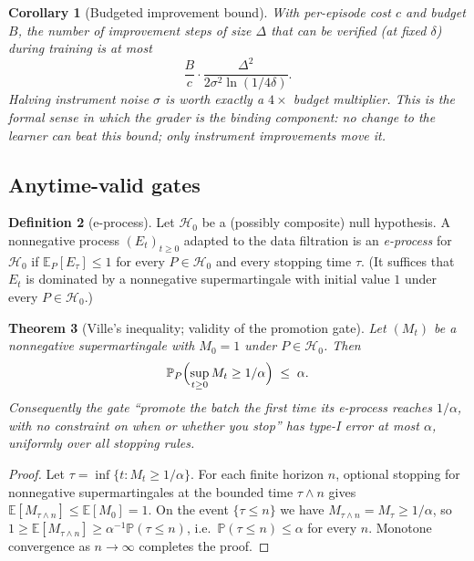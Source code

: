 \documentclass[11pt]{article}
\theoremstyle{plain}
\newtheorem{theorem}{Theorem}[section]
\newtheorem{corollary}[theorem]{Corollary}
\theoremstyle{definition}
\newtheorem{definition}[theorem]{Definition}
\theoremstyle{remark}
\newcommand{\E}{\mathbb{E}}
\newcommand{\Prob}{\mathbb{P}}
\newcommand{\cH}{\mathcal{H}}
\begin{document}
\begin{corollary}[Budgeted improvement bound]\label{cor:budget}
With per-episode cost $c$ and budget $B$, the number of improvement steps of
size $\Delta$ that can be \emph{verified} (at fixed $\delta$) during training
is at most
\[
  \frac{B}{c} \cdot \frac{\Delta^2}{2\sigma^2 \ln(1/4\delta)} .
\]
Halving instrument noise $\sigma$ is worth exactly a $4\times$ budget
multiplier. This is the formal sense in which the grader is the binding
component: \emph{no} change to the learner can beat this bound; only
instrument improvements move it.
\end{corollary}

\subsection{Anytime-valid gates}

\begin{definition}[e-process]\label{def:eprocess}
Let $\cH_0$ be a (possibly composite) null hypothesis. A nonnegative process
$(E_t)_{t \ge 0}$ adapted to the data filtration is an \emph{e-process} for
$\cH_0$ if $\E_P[E_\tau] \le 1$ for every $P \in \cH_0$ and every stopping
time $\tau$. (It suffices that $E_t$ is dominated by a nonnegative
supermartingale with initial value $1$ under every $P \in \cH_0$.)
\end{definition}

\begin{theorem}[Ville's inequality; validity of the promotion gate]
\label{thm:ville}
Let $(M_t)$ be a nonnegative supermartingale with $M_0 = 1$ under
$P \in \cH_0$. Then
\[
  \Prob_P\Bigl( \sup_{t \ge 0} M_t \ge 1/\alpha \Bigr) \;\le\; \alpha .
\]
Consequently the gate ``promote the batch the first time its e-process
reaches $1/\alpha$, with no constraint on when or whether you stop'' has
type-I error at most $\alpha$, \emph{uniformly over all stopping rules}.
\end{theorem}

\begin{proof}
Let $\tau = \inf\{t : M_t \ge 1/\alpha\}$. For each finite horizon $n$,
optional stopping for nonnegative supermartingales at the bounded time
$\tau \wedge n$ gives $\E[M_{\tau \wedge n}] \le \E[M_0] = 1$. On the event
$\{\tau \le n\}$ we have $M_{\tau \wedge n} = M_\tau \ge 1/\alpha$, so
$1 \ge \E[M_{\tau \wedge n}] \ge \alpha^{-1} \Prob(\tau \le n)$, i.e.\
$\Prob(\tau \le n) \le \alpha$ for every $n$. Monotone convergence as
$n \to \infty$ completes the proof.
\end{proof}
\end{document}
